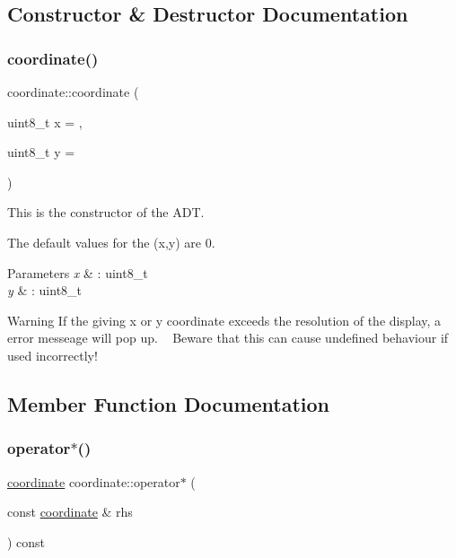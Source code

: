 \subsection{Constructor \& Destructor Documentation}
\mbox{\label{classcoordinate_a6d57bb57e6b0b6beda68f50fe9ca6f5a}} 
\subsubsection{\texorpdfstring{coordinate()}{coordinate()}}
{\footnotesize\ttfamily coordinate\+::coordinate (\begin{DoxyParamCaption}\item[{uint8\+\_\+t}]{x = {},  }\item[{uint8\+\_\+t}]{y = {} }\end{DoxyParamCaption})\hspace{0.3cm}{\ttfamily [inline]}}



This is the constructor of the A\+DT. 

The default values for the (x,y) are 0. 
\begin{DoxyParams}{Parameters}
{\em x} & \+: uint8\+\_\+t \\
\hline
{\em y} & \+: uint8\+\_\+t \\
\hline
\end{DoxyParams}
\begin{DoxyWarning}{Warning}
If the giving x or y coordinate exceeds the resolution of the display, a error messeage will pop up. ~\newline
Beware that this can cause undefined behaviour if used incorrectly! 
\end{DoxyWarning}


\subsection{Member Function Documentation}
\mbox{\label{classcoordinate_a5584a14ea2bf68d9f836f281ff0eca87}} 
\subsubsection{\texorpdfstring{operator$\ast$()}{operator*()}}
{\footnotesize\ttfamily \hyperlink{classcoordinate}{coordinate} coordinate\+::operator$\ast$ (\begin{DoxyParamCaption}\item[{const \hyperlink{classcoordinate}{coordinate} \&}]{rhs }\end{DoxyParamCaption}) const\hspace{0.3cm}{\ttfamily [inline]}}




